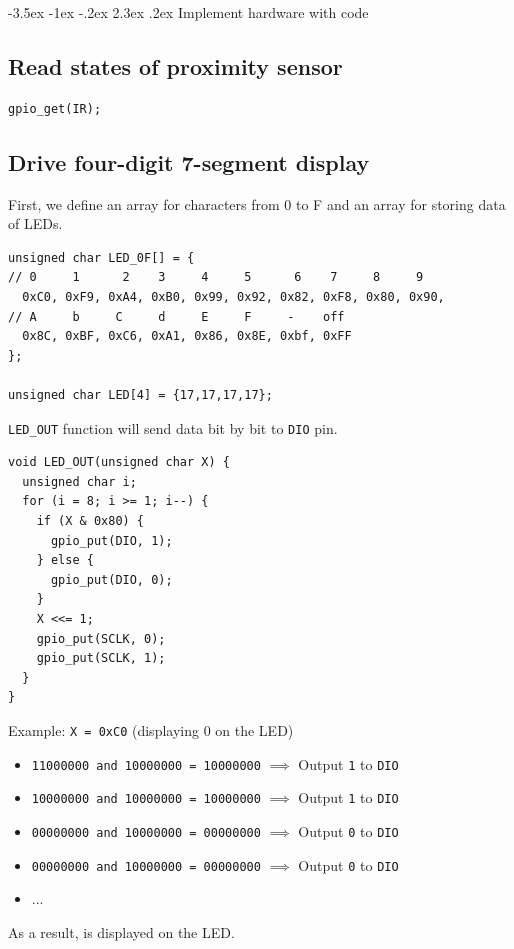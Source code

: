 \documentclass[13pt,a4paper,twoside]{report}
\makeatletter
\renewcommand\section{\@startsection {section}{1}{-1em}%
  {-3.5ex \@plus -1ex \@minus -.2ex}%
  {2.3ex \@plus.2ex}%
  {\normalfont\Large\bfseries}}
\makeatother
\begin{document}
\section{Implement hardware with code}
\subsection{Read states of proximity sensor}
\begin{verbatim}
gpio_get(IR);
\end{verbatim}

\subsection{Drive four-digit 7-segment display}
First, we define an array for characters from 0 to F and an array for storing data of LEDs.
\begin{verbatim}
unsigned char LED_0F[] = {
// 0     1      2    3     4     5      6    7     8     9
  0xC0, 0xF9, 0xA4, 0xB0, 0x99, 0x92, 0x82, 0xF8, 0x80, 0x90, 
// A     b     C     d     E     F     -    off
  0x8C, 0xBF, 0xC6, 0xA1, 0x86, 0x8E, 0xbf, 0xFF
};

unsigned char LED[4] = {17,17,17,17};
\end{verbatim}

\texttt{LED\_OUT} function will send data bit by bit to \texttt{DIO} pin.

\begin{verbatim}
void LED_OUT(unsigned char X) {
  unsigned char i;
  for (i = 8; i >= 1; i--) {
    if (X & 0x80) {
      gpio_put(DIO, 1);
    } else {
      gpio_put(DIO, 0);
    }
    X <<= 1;
    gpio_put(SCLK, 0);
    gpio_put(SCLK, 1);
  }
}
\end{verbatim}

Example: \texttt{X = 0xC0} (displaying 0 on the LED)
\begin{itemize}
\item \texttt{11000000 and 10000000 = 10000000} $\implies$ Output \texttt{1} to \texttt{DIO}
\item \texttt{10000000 and 10000000 = 10000000} $\implies$ Output \texttt{1} to \texttt{DIO}
\item \texttt{00000000 and 10000000 = 00000000} $\implies$ Output \texttt{0} to \texttt{DIO}
\item \texttt{00000000 and 10000000 = 00000000} $\implies$ Output \texttt{0} to \texttt{DIO}
\item ...
\end{itemize}
As a result,  is displayed on the LED.
\end{document}
